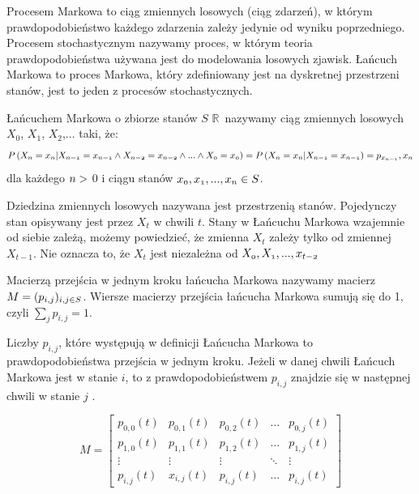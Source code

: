 Procesem Markowa to ciąg zmiennych losowych (ciąg zdarzeń), w którym prawdopodobieństwo każdego zdarzenia zależy jedynie od wyniku poprzedniego. Procesem stochastycznym nazywamy proces, w którym teoria prawdopodobieństwa używana jest do modelowania losowych zjawisk. Łańcuch Markowa to proces Markowa, który zdefiniowany jest na dyskretnej przestrzeni stanów, jest to jeden z procesów stochastycznych.

\begin{definicja}
	
	Łańcuchem Markowa o zbiorze stanów ${S}$ $\mathbb{R}$\ nazywamy ciąg zmiennych losowych $X_{0}$, $X_{1}$, $X_{2}$,... taki, że: \\
	 $$\mathnormal{P \left( X_{n} = x_{n}|X_{n-1} = x_{n-1} \wedge X_{n-2} = x_{n-2}
		\wedge ... \wedge X_{0} = x_{0} \right) = P \left( X_{n} = x_{n}|X_{n-1} = x_{n-1}\right)  = p_{x_{n-1}}, x_{n}}$$ 
	dla każdego $\mathnormal{n > }$ 0 i ciągu stanów $\mathnormal{x_{0}, x_{1}, ..., x_{n}} \in {S}$.
	
\end{definicja} 

Dziedzina zmiennych losowych nazywana jest przestrzenią stanów. Pojedynczy stan opisywany jest przez ${X_{t}}$ w chwili $t$. Stany w Łańcuchu Markowa wzajemnie od siebie zależą, możemy powiedzieć, że zmienna ${X_{t}}$ zależy tylko od zmiennej ${X_{t-1}}$. Nie oznacza to, że ${X_{t}}$ jest niezależna od $\mathnormal{X_{0}, X_{1}, ..., x_{t-2}}$  
 
\begin{definicja}
	Macierzą przejścia w jednym kroku łańcucha Markowa nazywamy macierz $\mathnormal{M = (p_{i,j})_{i,j \in S}}$. Wiersze macierzy przejścia łańcucha Markowa sumują się do 1, czyli $\sum_{j} p_{i,j} = 1 $.
\end{definicja}

Liczby $p_{i,j}$, które występują  w definicji Łańcucha Markowa to prawdopodobieństwa przejścia w jednym kroku. Jeżeli w danej chwili Łańcuch Markowa jest w stanie $i$, to z prawdopodobieństwem $p_{i,j}$ znajdzie się w następnej chwili w stanie $j$ .

\[
M=
\begin{bmatrix}
	p_{0,0}(t) & p_{0,1}(t) & p_{0,2}(t) & \dots  & p_{0,j}(t) \\
	p_{1,0}(t) & p_{1,1}(t) & p_{1,2}(t) & \dots  & p_{1,j}(t) \\
	\vdots & \vdots & \vdots & \ddots & \vdots \\
	p_{i,j}(t) & x_{i,j}(t) & p_{i,j}(t) & \dots  & p_{i,j}(t)
\end{bmatrix}
\]

